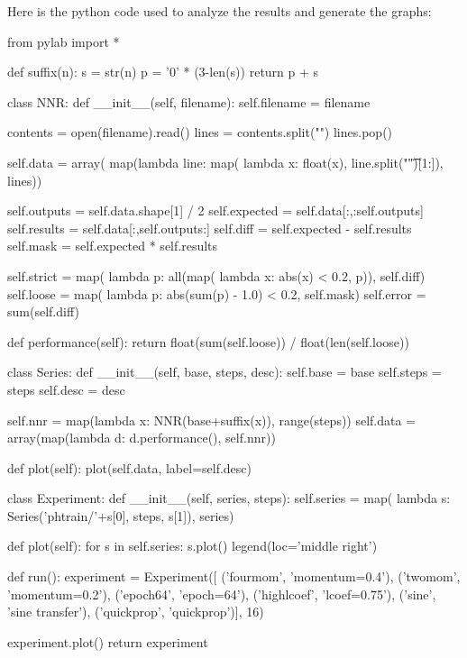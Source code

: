 \documentclass[12pt]{article}
\begin{document}
Here is the python code used to analyze the results and generate the graphs:

\begin{python}[]

from pylab import *

def suffix(n):
    s = str(n)
    p = '0' * (3-len(s))
    return p + s

class NNR:
    def __init__(self, filename):
        self.filename = filename

        contents = open(filename).read()
        lines = contents.split("\n")
        lines.pop()

        self.data = array(
            map(lambda line: map(
                    lambda x: float(x), line.split("\t")[1:]), 
                lines))

        self.outputs = self.data.shape[1] / 2
        self.expected = self.data[:,:self.outputs]
        self.results = self.data[:,self.outputs:]
        self.diff = self.expected - self.results
        self.mask = self.expected * self.results

        self.strict = map(
            lambda p: all(map(
                lambda x: abs(x) < 0.2, p)), self.diff)
        self.loose = map(
            lambda p: abs(sum(p) - 1.0) < 0.2, self.mask)
        self.error = sum(self.diff)

    def performance(self):
        return float(sum(self.loose)) / float(len(self.loose))

class Series:
    def __init__(self, base, steps, desc):
        self.base = base
        self.steps = steps
        self.desc = desc

        self.nnr = map(lambda x: NNR(base+suffix(x)), range(steps))
        self.data = array(map(lambda d: d.performance(), self.nnr))

    def plot(self):
        plot(self.data, label=self.desc)

class Experiment:
    def __init__(self, series, steps):
        self.series = map(
            lambda s: Series('phtrain/'+s[0], steps, s[1]), series)
        
    def plot(self):
        for s in self.series:
            s.plot()
        legend(loc='middle right')

def run():
    experiment = Experiment([
      ('fourmom', 'momentum=0.4'), 
      ('twomom', 'momentum=0.2'),
      ('epoch64', 'epoch=64'),
      ('highlcoef', 'lcoef=0.75'),
      ('sine', 'sine transfer'),
      ('quickprop', 'quickprop')], 16)

    experiment.plot()
    return experiment

\end{python}
\end{document}
